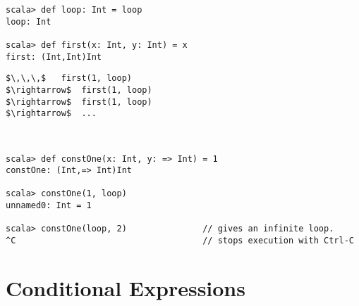 \begin{itemize}
\begin{lstlisting}
scala> def loop: Int = loop
loop: Int

scala> def first(x: Int, y: Int) = x
first: (Int,Int)Int
\end{lstlisting}
\begin{lstlisting}
$\,\,\,$   first(1, loop)
$\rightarrow$  first(1, loop)
$\rightarrow$  first(1, loop)
$\rightarrow$  ...
\end{lstlisting}

\example\ 
 
\begin{lstlisting}
scala> def constOne(x: Int, y: => Int) = 1
constOne: (Int,=> Int)Int

scala> constOne(1, loop)
unnamed0: Int = 1

scala> constOne(loop, 2)               // gives an infinite loop.
^C                                     // stops execution with Ctrl-C
\end{lstlisting}

\section{Conditional Expressions}





\end{itemize}
